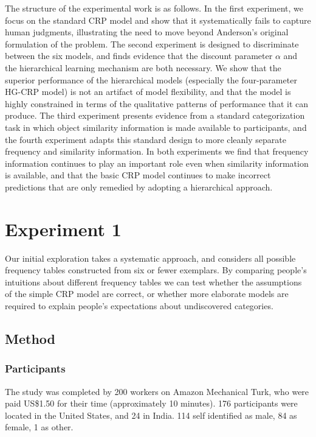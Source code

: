 \documentclass[doc]{apa6}
\begin{document}
The structure of the experimental work is as follows. In the first experiment, we focus on the standard CRP model and show that it systematically fails to capture human judgments, illustrating the need to move beyond Anderson's original formulation of the problem. The second experiment is designed to discriminate between the six models, and finds evidence that the discount parameter $\alpha$ and the hierarchical learning mechanism are both necessary. We show that the superior performance of the hierarchical models (especially the four-parameter HG-CRP model) is not an artifact of model flexibility, and that the model is highly constrained in terms of the qualitative patterns of performance that it can produce.  The third experiment presents evidence from a standard categorization task in which object similarity information is made available to participants, and the fourth experiment adapts this standard design to more cleanly separate frequency and similarity information. In both experiments we find that frequency information continues to play an important role even when similarity information is available, and that the basic CRP model continues to make incorrect predictions that are only remedied by adopting a hierarchical approach.


\section{Experiment 1}

Our initial exploration takes a systematic approach, and considers all possible frequency tables constructed from six or fewer exemplars. By comparing people's intuitions about different frequency tables we can test whether the assumptions of the simple CRP model are correct, or whether more elaborate models are required to explain people's expectations about undiscovered categories.


\subsection{Method}

\subsubsection{Participants} The study was completed by 200 workers on Amazon Mechanical Turk, who were paid US\$1.50 for their time (approximately 10 minutes). 176 participants were located in the United States, and 24 in India. 114 self identified as male, 84 as female, 1 as other.
\end{document}
